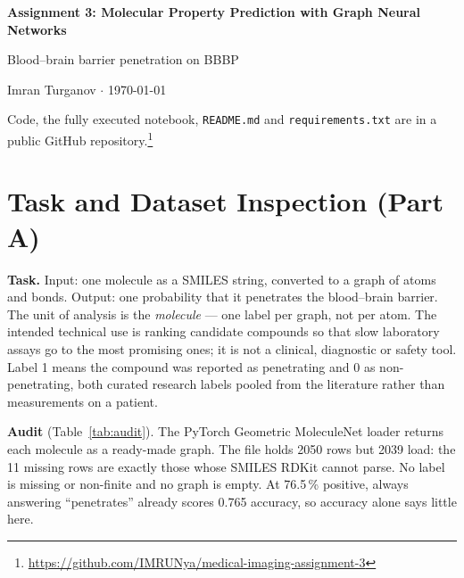 \documentclass[10pt]{article}
\begin{document}
\begin{center}
    {\Large\bfseries Assignment 3: Molecular Property Prediction with Graph Neural Networks\par}
    \vspace{2pt}
    {Blood--brain barrier penetration on BBBP\par}
    \vspace{2pt}
    Imran Turganov \quad $\cdot$ \quad \today
\end{center}
\vspace{-6pt}
Code, the fully executed notebook, \texttt{README.md} and \texttt{requirements.txt} are in a public GitHub
repository.\footnote{\url{https://github.com/IMRUNya/medical-imaging-assignment-3}}


\section{Task and Dataset Inspection (Part A)}
\label{sec:data}

\textbf{Task.} Input: one molecule as a SMILES string, converted to a graph of atoms and bonds. Output: one
probability that it penetrates the blood--brain barrier. The unit of analysis is the \emph{molecule} --- one label
per graph, not per atom. The intended technical use is ranking candidate compounds so that slow laboratory assays go
to the most promising ones; it is not a clinical, diagnostic or safety tool. Label 1 means the compound was reported
as penetrating and 0 as non-penetrating, both curated research labels pooled from the literature
\cite{Martins, MoleculeNet} rather than measurements on a patient.

\textbf{Audit} (Table~\ref{tab:audit}). The PyTorch Geometric MoleculeNet loader \cite{PyG} returns each molecule as
a ready-made graph. The file holds 2050 rows but 2039 load: the 11 missing rows are exactly those whose SMILES RDKit
\cite{RDKit} cannot parse. No label is missing or non-finite and no graph is empty. At 76.5\,\% positive, always
answering ``penetrates'' already scores 0.765 accuracy, so accuracy alone says little here.
\end{document}
